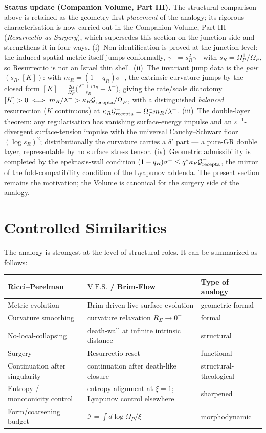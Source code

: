 \documentclass[11pt]{article}
\newcommand{\VFS}{\ensuremath{\mathrm{V.F.S.}}}
\newcommand{\Grec}{\mathcal G_{\rm recepta}}
\begin{document}
\medskip
\noindent\textbf{Status update (Companion Volume, Part III).}
The structural comparison above is retained as the geometry-first \emph{placement} of the analogy; its
rigorous characterisation is now carried out in the Companion Volume, Part III (\emph{Resurrectio as
Surgery}), which supersedes this section on the junction side and strengthens it in four ways.
(i)~Non-identification is proved at the junction level: the induced spatial metric itself jumps
conformally, \(\gamma^+=s_R^2\gamma^-\) with \(s_R=\Omega_P^+/\Omega_P^-\), so Resurrectio is not an
Israel thin shell.
(ii)~The invariant jump data is the \emph{pair} \((s_R,[K])\): with \(m_R=(1-q_R)\sigma^-\), the
extrinsic curvature jumps by the closed form
\([K]=\tfrac{2\alpha}{\Omega_P^-}\bigl(\tfrac{\lambda^-+m_R}{s_R}-\lambda^-\bigr)\), giving the
rate/scale dichotomy \([K]>0\iff m_R/\lambda^->\kappa_R\Grec^-/\Omega_P^-\), with a distinguished
\emph{balanced} resurrection (\(K\) continuous) at \(\kappa_R\Grec^-=\Omega_P^-m_R/\lambda^-\).
(iii)~The double-layer theorem: any regularisation has vanishing surface-energy impulse and an
\(\varepsilon^{-1}\)-divergent surface-tension impulse with the universal Cauchy--Schwarz floor
\((\log s_R)^2\); distributionally the curvature carries a \(\delta'\) part --- a pure-GR double layer,
representable by no surface stress tensor.
(iv)~Geometric admissibility is completed by the epektasis-wall condition
\((1-q_R)\sigma^-\le q^\ast\kappa_R\Grec^-\), the mirror of the fold-compatibility condition of the
Lyapunov addenda. The present section remains the motivation; the Volume is canonical for the surgery
side of the analogy.

\section{Controlled Similarities}

The analogy is strongest at the level of structural roles. It can be summarized as follows:

\begin{center}
\begin{tabular}{lll}
\toprule
Ricci--Perelman & \VFS{} / Brim-Flow & Type of analogy \\
\midrule
Metric evolution & Brim-driven live-surface evolution & geometric-formal \\
Curvature smoothing & curvature relaxation \(R_{\Sigma}\to0^-\) & formal \\
No-local-collapsing & death-wall at infinite intrinsic distance & structural \\
Surgery & Resurrectio reset & functional \\
Continuation after singularity & continuation after death-like closure & structural-theological \\
Entropy / monotonicity control & entropy alignment at \(\xi=1\); Lyapunov control elsewhere & sharpened \\
Form/coarsening budget & \(\mathcal I=\int d\log\Omega_P/\xi\) & morphodynamic \\
\bottomrule
\end{tabular}
\end{center}
\end{document}
